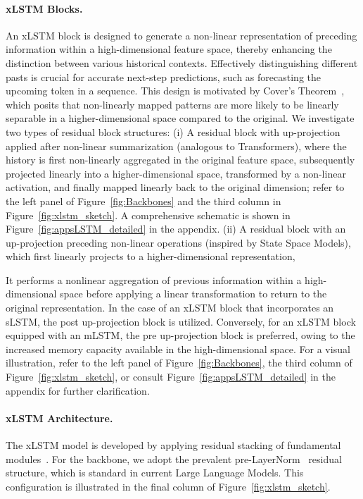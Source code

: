 \paragraph{xLSTM Blocks.}
\label{sec:xLSTMblock}
An xLSTM block is designed to generate a non-linear representation of preceding information within a high-dimensional feature space, thereby enhancing the distinction between various historical contexts. Effectively distinguishing different pasts is crucial for accurate next-step predictions, such as forecasting the upcoming token in a sequence. This design is motivated by Cover’s Theorem~\citep{Cover:65}, which posits that non-linearly mapped patterns are more likely to be linearly separable in a higher-dimensional space compared to the original. We investigate two types of residual block structures: (i) A residual block with up-projection applied after non-linear summarization (analogous to Transformers), where the history is first non-linearly aggregated in the original feature space, subsequently projected linearly into a higher-dimensional space, transformed by a non-linear activation, and finally mapped linearly back to the original dimension; refer to the left panel of Figure~\ref{fig:Backbones} and the third column in Figure~\ref{fig:xlstm_sketch}. A comprehensive schematic is shown in Figure~\ref{fig:appsLSTM_detailed} in the appendix. (ii) A residual block with an up-projection preceding non-linear operations (inspired by State Space Models), which first linearly projects to a higher-dimensional representation,

It performs a nonlinear aggregation of previous information within a high-dimensional space before applying a linear transformation to return to the original representation. In the case of an xLSTM block that incorporates an sLSTM, the post up-projection block is utilized. Conversely, for an xLSTM block equipped with an mLSTM, the pre up-projection block is preferred, owing to the increased memory capacity available in the high-dimensional space. For a visual illustration, refer to the left panel of Figure~\ref{fig:Backbones}, the third column of Figure~\ref{fig:xlstm_sketch}, or consult Figure~\ref{fig:appsLSTM_detailed} in the appendix for further clarification.

\paragraph{xLSTM Architecture. }
\label{sec:xLSTMarchitecure}
The xLSTM model is developed by applying residual stacking of fundamental modules~\citep{Srivastava:15,He:16}. For the backbone, we adopt the prevalent pre-LayerNorm~\citep{Ba:16b} residual structure, which is standard in current Large Language Models. This configuration is illustrated in the final column of Figure~\ref{fig:xlstm_sketch}.

